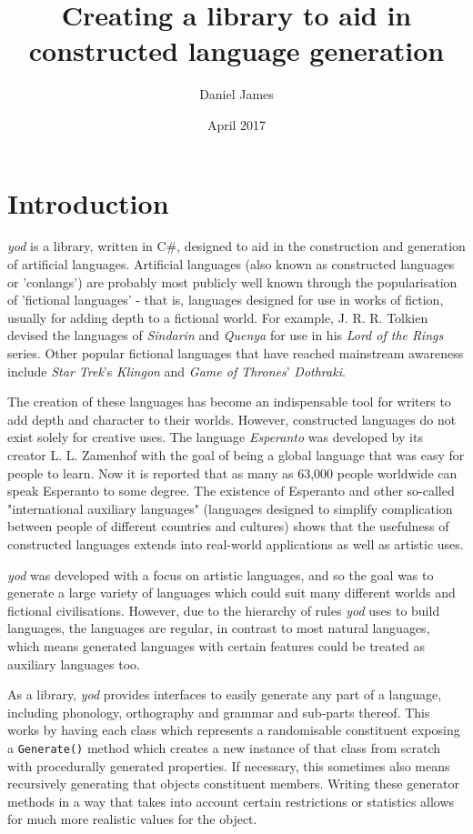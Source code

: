 \documentclass{report}
\title{Creating a library to aid in constructed language generation}
\author{Daniel James}
\date{April 2017}
\newcommand{\Csh}{C{\lserif\#}}
\begin{document}
   \maketitle
   
   \chapter{Introduction}
   \textit{yod} is a library, written in \Csh{}, designed to aid in the construction and generation of artificial languages. Artificial languages (also known as constructed languages or 'conlangs') are probably most publicly well known through the popularisation of 'fictional languages' - that is, languages designed for use in works of fiction, usually for adding depth to a fictional world. For example, J. R. R. Tolkien devised the languages of \textit{Sindarin} and \textit{Quenya} for use in his \textit{Lord of the Rings} series. Other popular fictional languages that have reached mainstream awareness include \textit{Star Trek}'s \textit{Klingon} and \textit{Game of Thrones}' \textit{Dothraki}.
   
   The creation of these languages has become an indispensable tool for writers to add depth and character to their worlds. However, constructed languages do not exist solely for creative uses. The language \textit{Esperanto} was developed by its creator L. L. Zamenhof with the goal of being a global language that was easy for people to learn\cite{unualibro}. Now it is reported that as many as 63,000 people worldwide can speak Esperanto to some degree\cite{esperanto}. The existence of Esperanto and other so-called "international auxiliary languages" (languages designed to simplify complication between people of different countries and cultures) shows that the usefulness of constructed languages extends into real-world applications as well as artistic uses.
   
   \textit{yod} was developed with a focus on artistic languages, and so the goal was to generate a large variety of languages which could suit many different worlds and fictional civilisations. However, due to the hierarchy of rules \textit{yod} uses to build languages, the languages are regular, in contrast to most natural languages, which means generated languages with certain features could be treated as auxiliary languages too.
   
   As a library, \textit{yod} provides interfaces to easily generate any part of a language, including phonology, orthography and grammar and sub-parts thereof. This works by having each class which represents a randomisable constituent exposing a \texttt{Generate()} method which creates a new instance of that class from scratch with procedurally generated properties. If necessary, this sometimes also means recursively generating that objects constituent members. Writing these generator methods in a way that takes into account certain restrictions or statistics allows for much more realistic values for the object.
   
\end{document}
